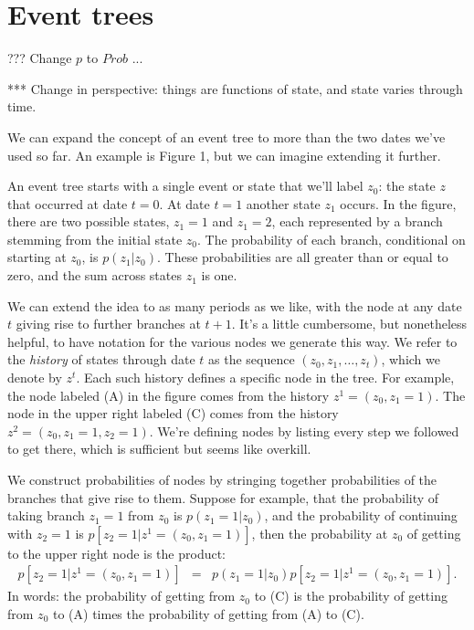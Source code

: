 \documentclass[11pt]{article}
\begin{document}
\section{Event trees}

??? Change $p$ to $Prob$ ...

*** Change in perspective:  things are functions of state, and state varies through time.

We can expand the concept of an event tree to more than the two
dates we've used so far.
An example is Figure 1, but we can imagine extending it further.

An event tree starts with a single event or state that we'll label $z_0$:
the state $z$ that occurred at date $t=0$.
At date $t=1$ another state $z_1$ occurs.
In the figure, there are two possible states, $z_1 = 1$ and $z_1 = 2$,
each represented by a branch stemming from the initial state $z_0$.
The probability of each branch, conditional on starting at $z_0$,
is $p(z_1| z_0)$. These probabilities are all greater than or equal to zero,
and the sum across states $z_1$ is one.

We can extend the idea to as many periods as we like,
with the node at any date $t$ giving rise to further branches at $t+1$.
It's a little cumbersome, but nonetheless helpful,
to have notation for the various nodes we generate this way.
We refer to the {\it history\/} of states through date $t$
as the sequence $(z_0, z_1, \ldots, z_t)$, which we denote by $z^t$.
Each such history defines a specific node in the tree.
For example, the node labeled (A) in the figure comes from the history
$z^1 = (z_0, z_1 = 1)$.
The node in the upper right labeled (C)
comes from the history $z^2 = (z_0, z_1 = 1, z_2 = 1)$.
We're defining nodes by listing every step we followed to get there,
which is sufficient but seems like overkill.

We construct probabilities of nodes by stringing together probabilities
of the branches that give rise to them.
Suppose for example, that the probability of
taking branch $z_1=1$ from $z_0$ is $p(z_1=1| z_0)$,
and the probability of continuing with $z_2 = 1$ is $p[z_2=1 | z^1 = (z_0, z_1=1) ]$,
then the probability at $z_0$ of getting to the upper right node is the product:
\begin{eqnarray*}
    p[z_2=1 | z^1 = (z_0, z_1=1) ] &=& p(z_1=1| z_0) p[z_2=1 | z^1 = (z_0, z_1=1) ] .
\end{eqnarray*}
In words:  the probability of getting from $z_0$ to (C)
is the probability of getting from $z_0$ to (A)
times the probability of getting from (A) to (C).
\end{document}
